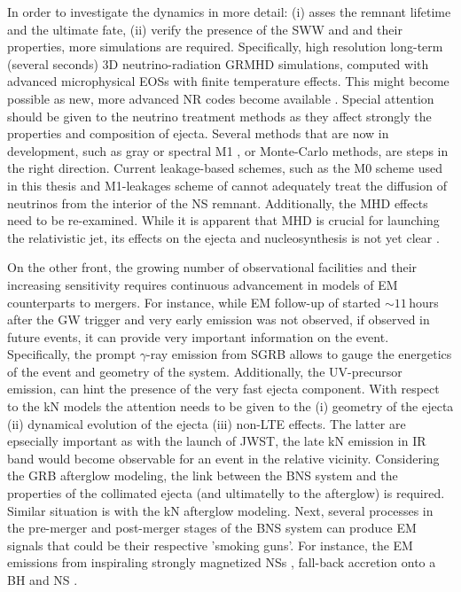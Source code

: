 In order to investigate the \pmerg{} dynamics in more detail: 
(i) asses the remnant lifetime and the ultimate fate, 
(ii) verify the presence of the \ac{SWW} and \nwind{} and their properties,
more simulations are required. 
%
Specifically, 
high resolution long-term (several seconds) $3$D neutrino-radiation \ac{GRMHD} 
simulations, computed with advanced microphysical \acp{EOS} with finite temperature effects.
This might become possible as new, more advanced \ac{NR} codes become available 
\citep[\eg][]{Daszuta:2021ecf}.
Special attention should be given to the neutrino treatment methods as they affect strongly the 
properties and composition of ejecta.
Several methods that are now in development, such as gray or spectral M1 \citep{Foucart:2016rxm,Roberts:2016lzn},
or Monte-Carlo methods, are steps in the right direction. Current leakage-based schemes, such as 
the M0 scheme used in this thesis and M1-leakages scheme of \citet{Sekiguchi:2015dma,Fujibayashi:2017puw}
cannot adequately treat the diffusion of neutrinos from the interior of the
\pmerg{} \ac{NS} remnant.
Additionally, the \ac{MHD} effects need to be re-examined. While it is 
apparent that \ac{MHD} is crucial for launching the relativistic jet, its effects on the 
ejecta and nucleosynthesis is not yet clear \citep{Siegel:2017jug, Fernandez:2018kax}.

On the other front, the growing number of observational facilities and their increasing 
sensitivity requires continuous advancement in models of \ac{EM} counterparts to mergers.
%
For instance, while \ac{EM} follow-up of \GW{} started ${\sim}11\,$hours after the \ac{GW} 
trigger and very early emission was not observed, if observed in future events, 
it can provide very important information on the event. 
Specifically, the prompt $\gamma$-ray emission from \ac{SGRB} allows to 
gauge the energetics of the event and geometry of the system.
Additionally, the UV-precursor emission, can hint the presence of the very 
fast ejecta component. 
%
With respect to the \ac{kN} models the attention needs to be given to the (i) geometry 
of the ejecta (ii) dynamical evolution of the ejecta (iii) non-\ac{LTE} effects.
The latter are epsecially important as with the launch of \ac{JWST}, the late \ac{kN} 
emission in \ac{IR} band would become observable for an event in the 
relative vicinity.
% 
Considering the \ac{GRB} afterglow modeling, the link between the \ac{BNS} system 
and the properties of the collimated ejecta (and ultimatelly to the afterglow) is 
required. Similar situation is with the \ac{kN} afterglow modeling.
%
Next, several processes in the pre-merger and post-merger stages of the 
\ac{BNS} system can produce \ac{EM} signals that could be their 
respective 'smoking guns'. 
For instance, the \ac{EM} emissions from inspiraling strongly magnetized \acp{NS} 
\citep[\eg][]{Beloborodov:2020ylo}, fall-back accretion onto a \ac{BH} \citep[\eg][]{Desai:2018rbc}
and \ac{NS} \citep[\eg][]{Gibson:2017dep}.
%

